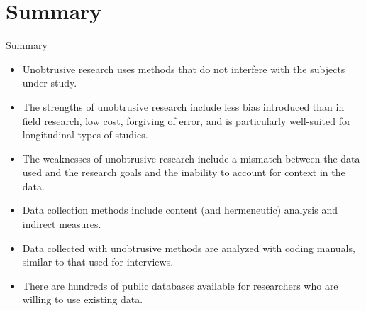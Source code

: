 \section{Summary}\label{ch12:summary}

\begin{center}
	\begin{tkawybox}{Summary}
		\begin{itemize}
			\setlength{\itemsep}{0pt}
			\setlength{\parskip}{0pt}
			\setlength{\parsep}{0pt}
			
			\item Unobtrusive research uses methods that do not interfere with the subjects under study.
			\item The strengths of unobtrusive research include less bias introduced than in field research, low cost, forgiving of error, and is particularly well-suited for longitudinal types of studies.
			\item The weaknesses of unobtrusive research include a mismatch between the data used and the research goals and the inability to account for context in the data.
			\item Data collection methods include content (and hermeneutic) analysis and indirect measures.
			\item Data collected with unobtrusive methods are analyzed with coding manuals, similar to that used for interviews.
			\item There are hundreds of public databases available for researchers who are willing to use existing data. 
		\end{itemize}
	\end{tkawybox}
\end{center}

